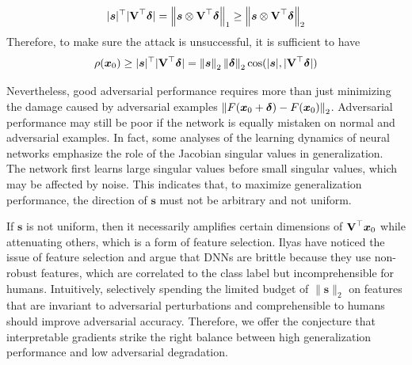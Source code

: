 \begin{equation}
   |\bm{s}|^\top |\bm{\mathrm{V}}^\top \bm{\delta}| = \left\lVert \bm s \otimes \bm{\mathrm{V}}^\top \bm{\delta} \right\rVert_1 \ge \left\lVert \bm s \otimes \bm{\mathrm{V}}^\top \bm{\delta} \right\rVert_2 
\end{equation}
Therefore, to make sure the attack is unsuccessful, it is sufficient to have
\begin{equation}
   \rho(\bm{x}_0) \ge |\bm{s}|^\top |\bm{\mathrm{V}}^\top \bm{\delta}|= \left\lVert\bm s\right\rVert_2  \left\lVert \bm{\delta}\right\rVert_2 \cos(|\bm s|, |\bm{\mathrm{V}}^\top\bm{\delta}|) 
\end{equation}

Nevertheless, good adversarial performance requires more than just minimizing the damage caused by adversarial examples $\left\lVert F(\bm{x}_0 + \bm{\delta}) - F(\bm{x}_0)\right\rVert_2$. Adversarial performance may still be poor if the network is equally mistaken on normal and adversarial examples. 
In fact, some analyses of the learning dynamics of neural networks \cite{Saxe2019,lampinen2019analytic} emphasize the role of the Jacobian singular values in generalization. The network first learns large singular values before small singular values, which may be affected by noise. This indicates that, to maximize generalization performance, the direction of $\bm s$ must not be arbitrary and not uniform. 

If $\bm s$ is not uniform, then it necessarily amplifies certain dimensions of $\bm{\mathrm{V}}^\top \bm x_0$ while attenuating others, which is a form of feature selection.
Ilyas \etal \cite{ilyas2019adversarial} have noticed the issue of feature selection and argue that DNNs are brittle because they use non-robust features, which are correlated to the class label but incomprehensible for humans. Intuitively, selectively spending the limited budget of $\| \bm s \|_2$  on features that are invariant to adversarial perturbations and comprehensible to humans should improve adversarial accuracy. Therefore, we offer the conjecture that interpretable gradients strike the right balance between high generalization performance and low adversarial degradation. 


